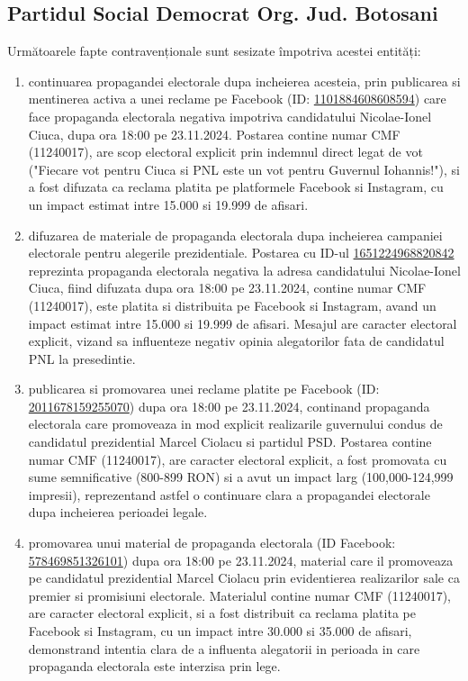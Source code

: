 \documentclass[a4paper,12pt]{article}
\begin{document}
\vspace{0.5cm}

\subsection{Partidul Social Democrat Org. Jud. Botosani}
Următoarele fapte contravenționale sunt sesizate împotriva acestei entități:

\begin{enumerate}[leftmargin=*, label=\arabic*.)]
    \item continuarea propagandei electorale dupa incheierea acesteia, prin publicarea si mentinerea activa a unei reclame pe Facebook (ID: \href{https://www.facebook.com/ads/library/?id=1101884608608594}{1101884608608594}) care face propaganda electorala negativa impotriva candidatului Nicolae-Ionel Ciuca, dupa ora 18:00 pe 23.11.2024. Postarea contine numar CMF (11240017), are scop electoral explicit prin indemnul direct legat de vot ("Fiecare vot pentru Ciuca si PNL este un vot pentru Guvernul Iohannis!"), si a fost difuzata ca reclama platita pe platformele Facebook si Instagram, cu un impact estimat intre 15.000 si 19.999 de afisari.
    \item difuzarea de materiale de propaganda electorala dupa incheierea campaniei electorale pentru alegerile prezidentiale. Postarea cu ID-ul \href{https://www.facebook.com/ads/library/?id=1651224968820842}{1651224968820842} reprezinta propaganda electorala negativa la adresa candidatului Nicolae-Ionel Ciuca, fiind difuzata dupa ora 18:00 pe 23.11.2024, contine numar CMF (11240017), este platita si distribuita pe Facebook si Instagram, avand un impact estimat intre 15.000 si 19.999 de afisari. Mesajul are caracter electoral explicit, vizand sa influenteze negativ opinia alegatorilor fata de candidatul PNL la presedintie.
    \item publicarea si promovarea unei reclame platite pe Facebook (ID: \href{https://www.facebook.com/ads/library/?id=2011678159255070}{2011678159255070}) dupa ora 18:00 pe 23.11.2024, continand propaganda electorala care promoveaza in mod explicit realizarile guvernului condus de candidatul prezidential Marcel Ciolacu si partidul PSD. Postarea contine numar CMF (11240017), are caracter electoral explicit, a fost promovata cu sume semnificative (800-899 RON) si a avut un impact larg (100,000-124,999 impresii), reprezentand astfel o continuare clara a propagandei electorale dupa incheierea perioadei legale.
    \item promovarea unui material de propaganda electorala (ID Facebook: \href{https://www.facebook.com/ads/library/?id=578469851326101}{578469851326101}) dupa ora 18:00 pe 23.11.2024, material care il promoveaza pe candidatul prezidential Marcel Ciolacu prin evidentierea realizarilor sale ca premier si promisiuni electorale. Materialul contine numar CMF (11240017), are caracter electoral explicit, si a fost distribuit ca reclama platita pe Facebook si Instagram, cu un impact intre 30.000 si 35.000 de afisari, demonstrand intentia clara de a influenta alegatorii in perioada in care propaganda electorala este interzisa prin lege.
\end{enumerate}
\end{document}
